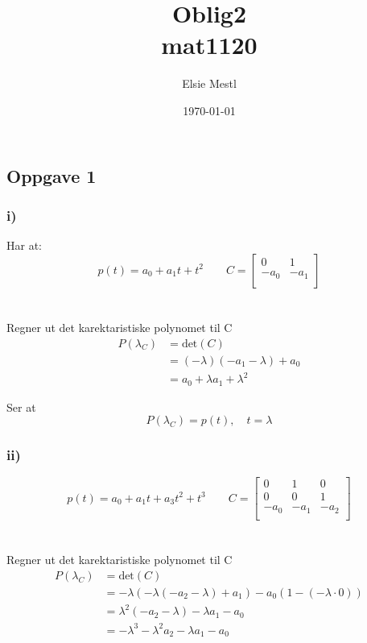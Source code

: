 \documentclass[a4paper, norsk, twoside, 10pt]{article}
\date{\today}
\title{Oblig2 \\ mat1120}
\author{Elsie Mestl}
\begin{document}
\maketitle
\begin{flushleft}


  \section*{Oppgave 1}
  \subsubsection*{i)}

  Har at:
\[
  p(t) = a_{0} + a_{1}t +  t^{2} \qquad
  C = \begin{bmatrix}
    0 & 1 \\
    -a_{0} & -a_{1} \\
  \end{bmatrix}
  \]
  \\
  \ \\

 
  Regner ut det karektaristiske polynomet til C 
  \begin{align*}
  P(\lambda_{C}) &= \text{det}(C)\\
  &= (-\lambda)(-a_{1} - \lambda) + a_{0} \\
  &= a_{0} + \lambda a_{1} + \lambda^{2}
  \end{align*}

  Ser at \[P(\lambda_{C}) = p(t), \quad t = \lambda\]



  
  \subsubsection*{ii)}

  \[
  p(t) = a_{0} + a_{1}t +  a_{3}t^{2} + t^{3} \qquad
  C = \begin{bmatrix}
    0 & 1 & 0\\
    0 & 0 & 1 \\
    -a_{0} & -a_{1} & -a_{2} \\
  \end{bmatrix} \] \\
  \ \\
  Regner ut det karektaristiske polynomet til C 
  \begin{align*}
  P(\lambda_{C}) &= \text{det}(C)\\
  &= -\lambda(-\lambda(-a_{2} - \lambda) + a_{1}) -a_{0}(1 - ( -\lambda \cdot 0))\\
  &= \lambda^{2}(-a_{2} - \lambda) - \lambda a_{1} - a_{0} \\
  &= -\lambda^{3} - \lambda^{2}a_{2} -\lambda a_{1} - a_{0}
  \end{align*}


\end{flushleft}
\end{document}

